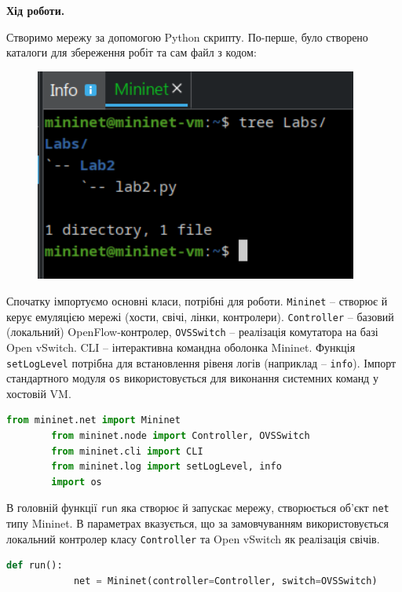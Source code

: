 \documentclass[14pt, a4paper]{extreport}
\begin{document}
	\begin{center}
		\textbf{Хід роботи.}
	\end{center}
	
	Створимо мережу за допомогою Python скрипту. По-перше, було створено каталоги для збереження робіт та сам файл з кодом:
	
	\begin{figure}[H]
		\centering
		\includegraphics[height=7cm]{01} 
	\end{figure}
	
	Спочатку імпортуємо основні класи, потрібні для роботи. \texttt{Mininet} -- створює й керує емуляцією мережі (хости, свічі, лінки, контролери). \texttt{Controller} -- базовий (локальний) OpenFlow-контролер, \texttt{OVSSwitch} -- реалізація комутатора на базі Open vSwitch. CLI -- інтерактивна командна оболонка Mininet. Функція \texttt{setLogLevel} потрібна для встановлення рівеня логів (наприклад -- \texttt{info}). Імпорт стандартного модуля \texttt{os} використовується для виконання системних команд у хостовій VM.
	
	\begin{lstlisting}[language=Python]
		from mininet.net import Mininet 
		from mininet.node import Controller, OVSSwitch 
		from mininet.cli import CLI 
		from mininet.log import setLogLevel, info 
		import os\end{lstlisting}

	В головній функції \texttt{run} яка створює й запускає мережу, створюється об’єкт \texttt{net} типу Mininet. В параметрах вказується, що за замовчуванням використовується локальний контролер класу \texttt{Controller} та Open vSwitch як реалізація свічів.
	
	\begin{lstlisting}[language=Python]
		def run():
			net = Mininet(controller=Controller, switch=OVSSwitch)\end{lstlisting}
	
\end{document}

